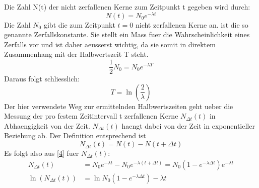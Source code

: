 \documentclass[titlepage=firstcover, captions=tableheading]{scrartcl}
\begin{document}
Die Zahl N(t) der nicht zerfallenen Kerne zum Zeitpunkt t gegeben wird durch:
\begin{equation}
    N(t)=N_0e^{-\lambda t} \label{4}
\end{equation}
Die Zahl $N_0$ gibt die zum Zeitpunkt $t=0$ nicht zerfallenen Kerne an. \lambda ist die so genannte Zerfallskonstante. Sie stellt ein Mass fuer die Wahrscheinlichkeit eines Zerfalls vor und ist daher aeusserst wichtig, da sie somit in direktem Zusammenhang mit der Halbwertszeit T steht. 
\begin{equation}
    \frac{1}{2}N_0=N_0e^{-\lambda T}\nonumber
\end{equation}
Daraus folgt schliesslich:
\begin{equation}
    T=\ln(\frac{2}{\lambda}) \nonumber
\end{equation}
Der hier verwendete Weg zur ermittelnden Halbwertszeiten geht ueber die Messung der pro festem Zeitintervall \Delta t  zerfallenen Kerne $N_{\Delta t}(t)$ in Abhaengigkeit von der Zeit. $N_{\Delta t}(t)$ haengt dabei von der Zeit in exponentieller Beziehung ab. Der Definition entsprechend ist 
\begin{equation}
    N_{\Delta t}(t) = N(t) - N(t+\Delta t)
\end{equation}
Es folgt also aus \ref{4} fuer $N_{\Delta t}(t)$:
\begin{align}
    N_{\Delta t}(t)&=N_0e^{-\lambda t}-N_0e^{-\lambda(t+\Delta t)}=N_0(1-e^{-\lambda\Delta t})e^{-\lambda t} \nonumber \\
    \ln(N_{\Delta t}(t))&=\ln N_0(1-e^{-\lambda\Delta t})-\lambda t
\end{align}
\end{document}
